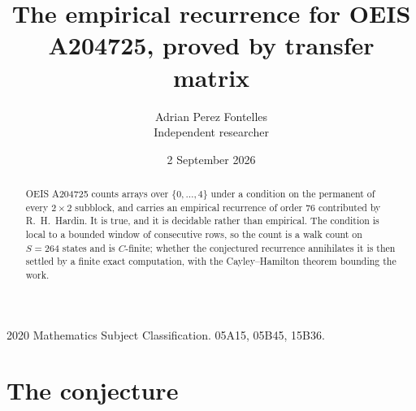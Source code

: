 \documentclass[11pt,a4paper]{article}
\title{The empirical recurrence for OEIS A204725, proved by transfer matrix}
\author{Adrian Perez Fontelles\\ \small Independent researcher}
\date{2 September 2026}
\theoremstyle{plain}
\theoremstyle{definition}
\begin{document}
\maketitle

\begin{abstract}
OEIS A204725 counts arrays over $\{0,\dots,4\}$ under a condition on the permanent of every
$2\times2$ subblock, and carries an empirical recurrence of order $76$ contributed by
R.~H.~Hardin. It is true, and it is decidable rather than empirical. The condition is local to
a bounded window of consecutive rows, so the count is a walk count on $S=264$ states and is
$C$-finite; whether the conjectured recurrence annihilates it is then settled by a finite exact
computation, with the Cayley--Hamilton theorem bounding the work.
\end{abstract}

\noindent\small 2020 Mathematics Subject Classification. 05A15, 05B45, 15B36.\normalsize

\section{The conjecture}
\end{document}
